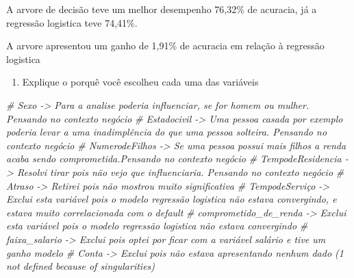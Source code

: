 \documentclass[
]{article}
\newenvironment{Shaded}{\begin{snugshade}}{\end{snugshade}}
\newcommand{\CommentTok}[1]{\textcolor[rgb]{0.56,0.35,0.01}{\textit{#1}}}
\providecommand{\tightlist}{%
  \setlength{\itemsep}{0pt}\setlength{\parskip}{0pt}}
\begin{document}
A arvore de decisão teve um melhor desempenho 76,32\% de acuracia, já a
regressão logistica teve 74,41\%.

A arvore apresentou um ganho de 1,91\% de acuracia em relação à
regressão logistica

\begin{enumerate}
\def\labelenumi{\alph{enumi})}
\setcounter{enumi}{3}
\tightlist
\item
  Explique o porquê você escolheu cada uma das variáveis
\end{enumerate}

\begin{Shaded}
\begin{Highlighting}[]
\CommentTok{\# Sexo {-}\textgreater{} Para a analise poderia influenciar, se for homem ou mulher. Pensando no contexto negócio}
\CommentTok{\# Estadocivil {-}\textgreater{} Uma pessoa casada por exemplo poderia levar a uma inadimplência do que uma pessoa  solteira. Pensando no contexto negócio}
\CommentTok{\# NumerodeFilhos {-}\textgreater{} Se uma pessoa possui mais filhos a renda acaba sendo comprometida.Pensando no contexto negócio }
\CommentTok{\# TempodeResidencia {-}\textgreater{} Resolvi tirar pois não vejo que influenciaria. Pensando no contexto negócio }
\CommentTok{\# Atraso {-}\textgreater{} Retirei pois não mostrou muito significativa}
\CommentTok{\# TempodeServiço {-}\textgreater{} Exclui esta variável pois o modelo regressão logistica não estava convergindo, e                    estava muito correlacionada com o default}
\CommentTok{\# comprometido\_de\_renda {-}\textgreater{} Exclui esta variável pois o modelo regressão logistica não estava convergindo}
\CommentTok{\# faixa\_salario {-}\textgreater{} Exclui pois optei por ficar com a variável salário e tive um ganho modelo}
\CommentTok{\# Conta {-}\textgreater{} Exclui pois não estava apresentando nenhum dado (1 not defined because of singularities)}
\end{Highlighting}
\end{Shaded}
\end{document}
